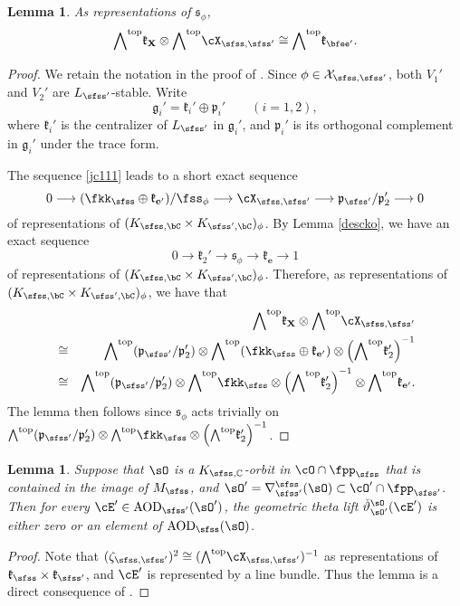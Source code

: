 \documentclass[12pt,a4paper]{amsart}
\newcommand{\CX}{{\mathcal {X}}}
\newcommand{\g}{\mathfrak g}
\newcommand{\p}{\mathfrak p}
\newcommand{\X}{\mathbf{X}}
\numberwithin{equation}{section}
\newtheorem{lem}[thm]{Lemma}
\theoremstyle{remark}
\def\cOp{\cO^{\prime}}
\begin{document}
\begin{lem}\label{lem:tan}
 As representations of  $\mathfrak s_\phi$,
  \begin{equation}\label{eq:aod}
    \wedgetop \mathfrak k_{\X} \otimes \wedgetop \CXss  \cong \wedgetop \mathfrak k_{\Xp}.
  \end{equation}
\end{lem}
\begin{proof}
  We retain the notation in the proof of . Since $\phi\in \CX_{\sfss, \sfss'}$, both $V_1'$ and $V_2'$ are $L_{\sfss'}$-stable.  Write
  \[
    \g_i'=\mathfrak k_i'\oplus \p_i'\qquad (i=1,2),
  \]
  where $\mathfrak k_i'$ is the centralizer of $L_{\sfss'}$ in $\g_i'$, and $\p_i'$ is its orthogonal complement in $\g_i'$ under the trace form.

   The sequence \eqref{jc111} leads to a short exact sequence
  \[
    0\longrightarrow (\fkks\oplus \mathfrak k_{\mathbf e'})/ \fss_{\ww}
    \longrightarrow \CXss \longrightarrow \p_{\sfss'}/\p_2'  \longrightarrow 0
  \]
  of representations of $(\Ks\times \Ksp)_{\ww}$.
By
Lemma \ref{descko}, we have an exact sequence
\[
  0\rightarrow \mathfrak k_2'\rightarrow \mathfrak s_\phi\rightarrow \mathfrak k_{\mathbf e}\rightarrow 1
\]
of representations of $(\Ks\times \Ksp)_{\ww}$. Therefore, as  representations of $(\Ks\times \Ksp)_{\ww}$, we have that
\begin{eqnarray*}
      &&\wedgetop \mathfrak k_{\X} \otimes \wedgetop \CXss\\
      & \cong & \wedgetop (\p_{\sfss'}/\p_2')  \otimes \wedgetop (\fkks\oplus \mathfrak k_{\mathbf e'}) \otimes
      \left(\wedgetop \mathfrak k_2'\right)^{-1}\\
       & \cong & \wedgetop (\p_{\sfss'}/\p_2')  \otimes  \wedgetop \fkks \otimes
      \left(\wedgetop \mathfrak k_2'\right)^{-1}\otimes \wedgetop  \mathfrak k_{\mathbf e'}. \\
\end{eqnarray*}
The lemma then follows since $\mathfrak s_\phi$ acts trivially on $ \wedgetop (\p_{\sfss'}/\p_2')  \otimes  \wedgetop \fkks \otimes
      \left(\wedgetop \mathfrak k_2'\right)^{-1}$.

      \end{proof}



\begin{lem}\label{lem:aod}
  Suppose that $\sO$ is a $K_{\sfss,\C}$-orbit in $\cO\cap \fpps$ that is contained in the image of $M_\sfss$,  and
  $\sOp = \DDss(\sO)\subset \cOp\cap \fppsp$.
  Then for every $\cE' \in \AOD_{\sfss'}(\sOp)$,
   the geometric theta lift $\dlift_{\sO'}^{\sO}(\cE')$ is either zero or an element of  $\AOD_{\sfss}(\sO)$.
\end{lem}
\begin{proof}
  Note that $(\zeta_{\sfss,\sfss'})^{2} \cong (\wedgetop \CXss)^{-1}$ as representations of $\mathfrak k_\sfss\times \mathfrak k_{\sfss'}$, and $\cE'$ is represented by a line bundle. Thus
   the lemma is a direct consequence of  .
\end{proof}
\end{document}
